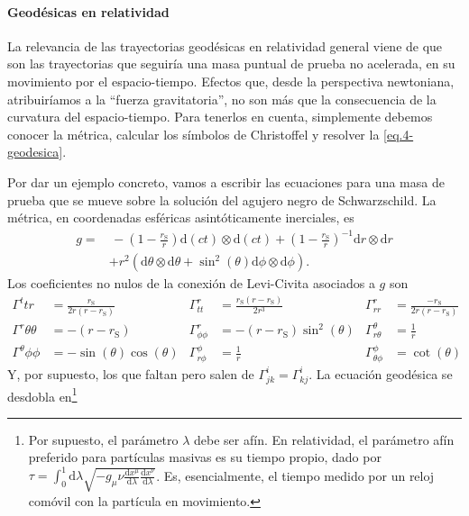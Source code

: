 \paragraph{Geodésicas en relatividad}

La relevancia de las trayectorias geodésicas en relatividad general viene de que son las trayectorias que seguiría una masa puntual de prueba no acelerada, en su movimiento por el espacio-tiempo. Efectos que, desde la perspectiva newtoniana, atribuiríamos a la ``fuerza gravitatoria'', no son más que la consecuencia de la curvatura del espacio-tiempo. Para tenerlos en cuenta, simplemente debemos conocer la métrica, calcular los símbolos de Christoffel y resolver la \cref{eq.4-geodesica}.

Por dar un ejemplo concreto, vamos a escribir las ecuaciones para una masa de prueba que se mueve sobre la solución del agujero negro de Schwarzschild. La métrica, en coordenadas esféricas asintóticamente inerciales, es
\begin{align}
    \nonumber
    g =&\, -\left(1-\frac{r_\text{S}}{r}\right)\mathrm{d}(ct)\otimes\mathrm{d}(ct) + \left(1-\frac{r_\text{S}}{r}\right)^{-1}\mathrm{d}r\otimes\mathrm{d}r \\
    &+ r^2\left(\mathrm{d}\theta\otimes\mathrm{d}\theta + \sin^2(\theta)\mathrm{d}\phi\otimes\mathrm{d}\phi\right).
\end{align}
Los coeficientes no nulos de la conexión de Levi-Civita asociados a \(g\) son
\begin{align*}
    \Gamma^{t}{tr} &= \frac{r_\text{S}}{2r(r - r_\text{S})} & \Gamma^{r}_{tt} &= \frac{r_\mathrm{S}(r-r_\mathrm{S})}{2r^3} & \Gamma^r_{rr} &= \frac{-r_\mathrm{S} }{2r(r-r_\mathrm{S})}\\
    \Gamma^{r}{\theta\theta} &= -(r - r_\text{S}) & \Gamma^{r}_{\phi\phi} &= -(r - r_\text{S})\sin^2(\theta) & \Gamma^\theta_{r\theta} &= \frac{1}{r}\\
    \Gamma^{\theta}{\phi\phi} &= -\sin(\theta)\cos(\theta) & \Gamma^{\phi}_{r\phi} &= \frac{1}{r} & \Gamma^\phi_{\theta\phi} &= \cot(\theta)
\end{align*}
Y, por supuesto, los que faltan pero salen de \(\Gamma^i_{jk}=\Gamma^i_{kj}\). La ecuación geodésica se desdobla en\footnote{Por supuesto, el parámetro \(\lambda\) debe ser afín. En relatividad, el parámetro afín preferido para partículas masivas es su tiempo propio, dado por \(\tau = \int_0^1 \mathrm{d}\lambda \sqrt{-g_\mu\nu\frac{\mathrm{d}x^\mu}{\mathrm{d}\lambda}\frac{\mathrm{d}x^\nu}{\mathrm{d}\lambda}}\). Es, esencialmente, el tiempo medido por un reloj comóvil con la partícula en movimiento.}
